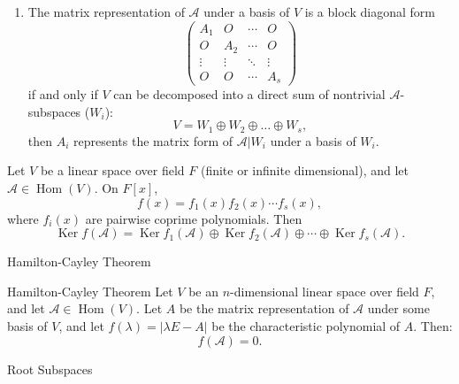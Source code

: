 \documentclass[11pt]{../../TexTemplate/elegantbook} %
\begin{document}
\begin{theorem}
\begin{enumerate}
        \item The matrix representation of \( \mathcal{A} \) under a basis of \( V \) 
            is a block diagonal form 
            \[
            \begin{pmatrix}
                A_1 & O & \cdots & O \\
                O & A_2 & \cdots & O \\
                \vdots & \vdots & \ddots & \vdots \\
                O & O & \cdots & A_s
            \end{pmatrix}
            \]
            if and only if \( V \) can be decomposed into a direct sum of nontrivial \( \mathcal{A} \)-subspaces (\(W_{i}\)):
            \[
            V = W_1 \oplus W_2 \oplus \dots \oplus W_s,
            \]
            then \( A_i \) represents the matrix form of \( \mathcal{A}|{W_i} \) under a basis of \( W_i \).
    \end{enumerate}
\end{theorem}

\begin{proposition}
    Let \( V \) be a linear space over field \( F \) (finite or infinite dimensional), 
    and let \( \mathcal{A}\in \operatorname{Hom}(V) \).
    On \(F[x]\), 
    \[
    f(x) = f_{1}(x)f_{2}(x)\cdots f_{s}(x),
    \]
    where \( f_{i}(x) \) are pairwise coprime polynomials.
    Then
    \[
    \operatorname{Ker}f(\mathcal{A}) 
    = \operatorname{Ker}f_{1}(\mathcal{A}) \oplus 
    \operatorname{Ker}f_{2}(\mathcal{A}) \oplus \cdots \oplus \operatorname{Ker}f_{s}(\mathcal{A}).
    \]
\end{proposition}



\begin{leftbarTitle}{Hamilton-Cayley Theorem}\end{leftbarTitle}
\begin{theorem}{Hamilton-Cayley Theorem}
    Let \( V \) be an \( n \)-dimensional linear space over field \( F \), 
    and let \( \mathcal{A}\in \operatorname{Hom}(V) \).
    Let \( A \) be the matrix representation of \( \mathcal{A} \) under some basis of \( V \),
    and let \( f(\lambda) = |\lambda E - A| \) be the characteristic polynomial of \( A \).
    Then:
    \[
    f(\mathcal{A}) = 0.
    \]
\end{theorem}

\begin{definition}{Root Subspaces}
\end{definition}
\end{document}
